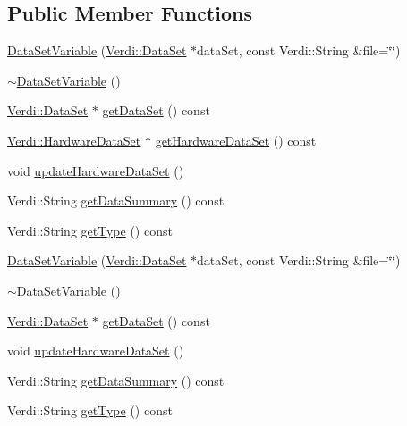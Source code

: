 \subsection*{\-Public \-Member \-Functions}
\begin{DoxyCompactItemize}
\item 
\hyperlink{class_data_set_variable_a6441076b006af6e020be9282fe36ba1c}{\-Data\-Set\-Variable} (\hyperlink{class_verdi_1_1_data_set}{\-Verdi\-::\-Data\-Set} $\ast$data\-Set, const \-Verdi\-::\-String \&file=\char`\"{}\char`\"{})
\item 
\hyperlink{class_data_set_variable_a0d9f06e7f8adf609eae41ff89d8e367c}{$\sim$\-Data\-Set\-Variable} ()
\item 
\hyperlink{class_verdi_1_1_data_set}{\-Verdi\-::\-Data\-Set} $\ast$ \hyperlink{class_data_set_variable_a3fbfcf67ba5938523d1264f0728adee8}{get\-Data\-Set} () const 
\item 
\hyperlink{class_verdi_1_1_hardware_data_set}{\-Verdi\-::\-Hardware\-Data\-Set} $\ast$ \hyperlink{class_data_set_variable_ab409c5f5e6f513bfe54cc1af07b53542}{get\-Hardware\-Data\-Set} () const 
\item 
void \hyperlink{class_data_set_variable_a6d7fe75406d9274e40ff958d2037bb7c}{update\-Hardware\-Data\-Set} ()
\item 
\-Verdi\-::\-String \hyperlink{class_data_set_variable_a301a71bf58f60f5926f8d1358e35f907}{get\-Data\-Summary} () const 
\item 
\-Verdi\-::\-String \hyperlink{class_data_set_variable_aadb87b0335536945f3498f5f13e3a071}{get\-Type} () const 
\item 
\hyperlink{class_data_set_variable_a6441076b006af6e020be9282fe36ba1c}{\-Data\-Set\-Variable} (\hyperlink{class_verdi_1_1_data_set}{\-Verdi\-::\-Data\-Set} $\ast$data\-Set, const \-Verdi\-::\-String \&file=\char`\"{}\char`\"{})
\item 
\hyperlink{class_data_set_variable_a0d9f06e7f8adf609eae41ff89d8e367c}{$\sim$\-Data\-Set\-Variable} ()
\item 
\hyperlink{class_verdi_1_1_data_set}{\-Verdi\-::\-Data\-Set} $\ast$ \hyperlink{class_data_set_variable_a3fbfcf67ba5938523d1264f0728adee8}{get\-Data\-Set} () const 
\item 
void \hyperlink{class_data_set_variable_a6d7fe75406d9274e40ff958d2037bb7c}{update\-Hardware\-Data\-Set} ()
\item 
\-Verdi\-::\-String \hyperlink{class_data_set_variable_a301a71bf58f60f5926f8d1358e35f907}{get\-Data\-Summary} () const 
\item 
\-Verdi\-::\-String \hyperlink{class_data_set_variable_aadb87b0335536945f3498f5f13e3a071}{get\-Type} () const 
\end{DoxyCompactItemize}
